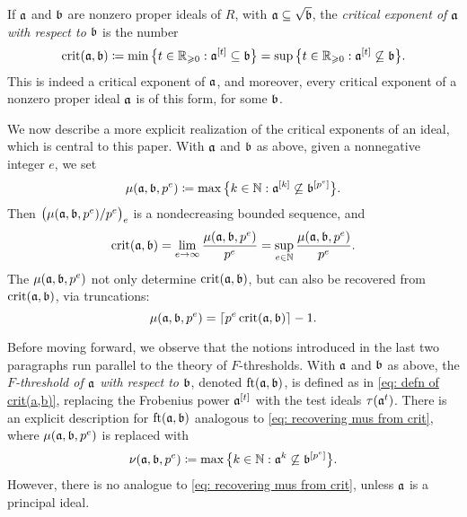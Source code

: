 \documentclass[11pt]{amsart}
\begin{document}
If $\mathfrak{a}$ and $\mathfrak{b}$ are nonzero proper ideals of $R$, with $\mathfrak{a} \subseteq \sqrt{\mathfrak{b}}$, the \emph{critical exponent of $\mathfrak{a}$ with respect to $\mathfrak{b}$} is the number
\begin{equation}\label{eq: defn of crit(a,b)}
   \operatorname{crit}(\mathfrak{a},\mathfrak{b}) \coloneqq \min\big\{t\in \mathbb{R}_{\geqslant 0}: \mathfrak{a}^{[t]} \subseteq \mathfrak{b}\big\}
      = \sup\big\{t\in \mathbb{R}_{\geqslant 0}: \mathfrak{a}^{[t]} \not\subseteq \mathfrak{b}\big\}.
\end{equation}
This is indeed a critical exponent of $\mathfrak{a}$, and moreover, every critical exponent of a nonzero proper ideal $\mathfrak{a}$ is of this form, for some $\mathfrak{b}$.

We now describe a more explicit realization of the critical exponents of an ideal, which is central to this paper.
With $\mathfrak{a}$ and $\mathfrak{b}$ as above, given a nonnegative integer $e$, we set
\[\mu(\mathfrak{a},\mathfrak{b},p^e) \coloneqq \max\big\{k\in \mathbb{N} : \mathfrak{a}^{[k]} \not\subseteq \mathfrak{b}^{[p^e]}\big\}.\]
Then $\big(\mu(\mathfrak{a},\mathfrak{b},p^e)/p^e\big)_e$ is a nondecreasing bounded sequence, and 
\begin{equation}\label{eq: crit as a limit of mus}
   \operatorname{crit}(\mathfrak{a},\mathfrak{b}) = \lim_{e\to \infty} \frac{\mu(\mathfrak{a},\mathfrak{b},p^e)}{p^e} = \sup_{e\in \mathbb{N}} \frac{\mu(\mathfrak{a},\mathfrak{b},p^e)}{p^e}.
\end{equation}
The $\mu(\mathfrak{a},\mathfrak{b},p^e)$ not only determine $\operatorname{crit}(\mathfrak{a},\mathfrak{b})$, but can also be recovered from $\operatorname{crit}(\mathfrak{a},\mathfrak{b})$, via truncations:
\begin{equation}\label{eq: recovering mus from crit}
   \mu(\mathfrak{a},\mathfrak{b},p^e) = \left\lceil p^e\operatorname{crit}(\mathfrak{a},\mathfrak{b}) \right\rceil - 1.
\end{equation}

Before moving forward, we observe that the notions introduced in the last two paragraphs run parallel to the theory of $F$-thresholds.
With $\mathfrak{a}$ and $\mathfrak{b}$ as above, the \emph{$F$-threshold of $\mathfrak{a}$ with respect to $\mathfrak{b}$}, denoted $\operatorname{ft}(\mathfrak{a}, \mathfrak{b})$, is defined as in \eqref{eq: defn of crit(a,b)}, replacing the Frobenius power $\mathfrak{a}^{[t]}$ with the test ideals $\tau(\mathfrak{a}^t)$.
There is an explicit description for $\operatorname{ft}(\mathfrak{a}, \mathfrak{b})$ analogous to \eqref{eq: recovering mus from crit}, where $\mu(\mathfrak{a},\mathfrak{b},p^e)$ is replaced with
\[\nu(\mathfrak{a},\mathfrak{b},p^e) \coloneqq \max\big\{k\in \mathbb{N} : \mathfrak{a}^{k} \not\subseteq \mathfrak{b}^{[p^e]}\big\}.\]
However, there is no analogue to \eqref{eq: recovering mus from crit}, unless $\mathfrak{a}$ is a principal ideal.
\end{document}
